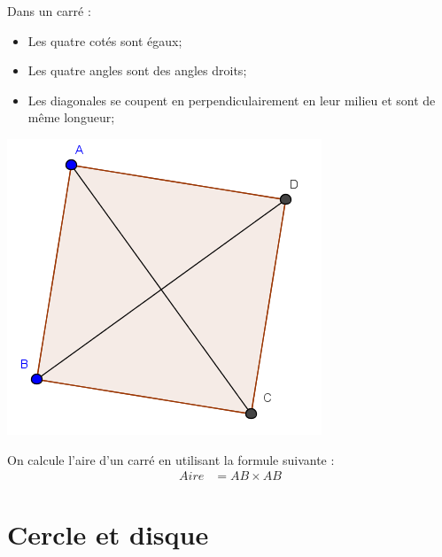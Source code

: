 \documentclass[12pt,a4paper]{article}
\begin{document}
\begin{myprops}
	
	\begin{multicols}{2}
		
		Dans un carré :
		\begin{itemize}
			\item Les quatre cotés sont égaux;
			\item Les quatre angles sont des angles droits;
			\item Les diagonales se coupent en perpendiculairement en leur milieu et sont de même longueur;
			
		\end{itemize}
		
		
		\includegraphics[scale=0.6]{./img/carre}
	\end{multicols}
	
\end{myprops}

\begin{mymeth}
	On calcule l'aire d'un carré en utilisant la formule suivante :
	\vspace*{-1cm}
	\begin{align*}
	Aire &= AB \times AB
	\end{align*}
\end{mymeth}

\section{Cercle et disque}
\end{document}
